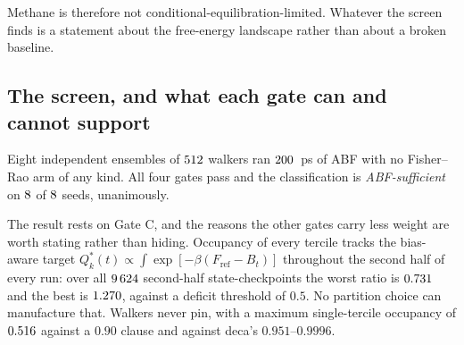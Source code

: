 Methane is therefore not conditional-equilibration-limited. Whatever the screen finds is a
statement about the free-energy landscape rather than about a broken baseline.

\subsection{The screen, and what each gate can and cannot support}

Eight independent ensembles of $512$ walkers ran $200$~ps of ABF with no Fisher--Rao
arm of any kind. All four gates pass and the classification is \emph{ABF-sufficient} on
$8$ of $8$ seeds, unanimously.

The result rests on Gate C, and the reasons the other gates carry less weight are worth stating
rather than hiding. Occupancy of every tercile tracks the bias-aware target
$Q^*_k(t) \propto \int \exp[-\beta(F_{\mathrm{ref}} - B_t)]$ throughout the second half of every
run: over all $9\,624$ second-half state-checkpoints the worst ratio is
$0.731$ and the best is $1.270$, against a deficit threshold of $0.5$. No partition choice can manufacture
that. Walkers never pin, with a maximum single-tercile occupancy of $0.516$ against a $0.90$
clause and against deca's $0.951$--$0.9996$.


